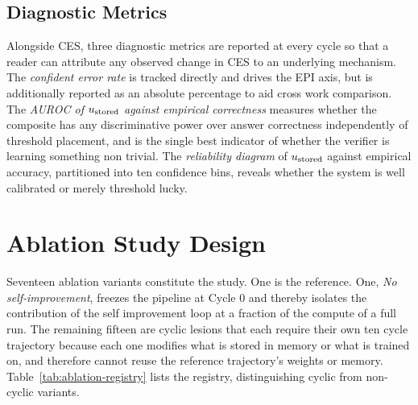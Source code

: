 \subsection{Diagnostic Metrics}
\label{sec:diagnostics}

Alongside CES, three diagnostic metrics are reported at every cycle so that a reader can attribute any observed change in CES to an underlying mechanism. The \emph{confident error rate} is tracked directly and drives the EPI axis, but is additionally reported as an absolute percentage to aid cross work comparison. The \emph{AUROC of $u_{\text{stored}}$ against empirical correctness} measures whether the composite has any discriminative power over answer correctness independently of threshold placement, and is the single best indicator of whether the verifier is learning something non trivial. The \emph{reliability diagram} of $u_{\text{stored}}$ against empirical accuracy, partitioned into ten confidence bins, reveals whether the system is well calibrated or merely threshold lucky.

\section{Ablation Study Design}
\label{sec:ablation-design}

Seventeen ablation variants constitute the study. One is the reference. One, \emph{No self-improvement}, freezes the pipeline at Cycle 0 and thereby isolates the contribution of the self improvement loop at a fraction of the compute of a full run. The remaining fifteen are cyclic lesions that each require their own ten cycle trajectory because each one modifies what is stored in memory or what is trained on, and therefore cannot reuse the reference trajectory's weights or memory. Table~\ref{tab:ablation-registry} lists the registry, distinguishing cyclic from non-cyclic variants.

